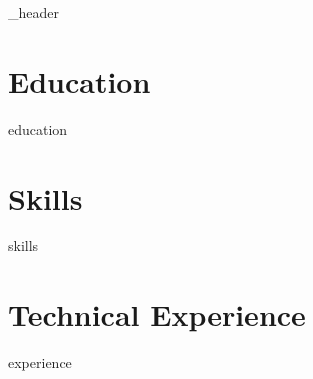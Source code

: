 \documentclass[letter,10pt]{article}
\author{Raj Singh} %
\begin{document}
{_header}
\section{Education}
{education}

\section{Skills}
{skills}

\section{Technical Experience}
{experience}

\end{document}

